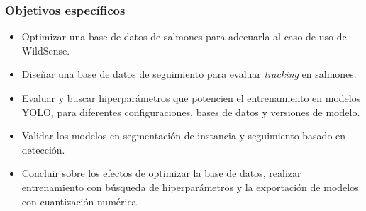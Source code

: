 \subsubsection{Objetivos específicos}
\begin{itemize}
    \setlength{\itemsep}{0pt}%
    \setlength{\parskip}{0pt}%
    \setlength{\parsep}{0pt}%
    \item Optimizar una base de datos de salmones para adecuarla al caso de uso de WildSense.
    \item Diseñar una base de datos de seguimiento para evaluar \textit{tracking} en salmones.
    \item Evaluar y buscar hiperparámetros que potencien el entrenamiento en modelos YOLO, para diferentes configuraciones, bases de datos y versiones de modelo.
    \item Validar los modelos en segmentación de instancia y seguimiento basado en detección.
    \item Concluir sobre los efectos de optimizar la base de datos, realizar entrenamiento con búsqueda de hiperparámetros y la exportación de modelos con cuantización numérica.
\end{itemize}


